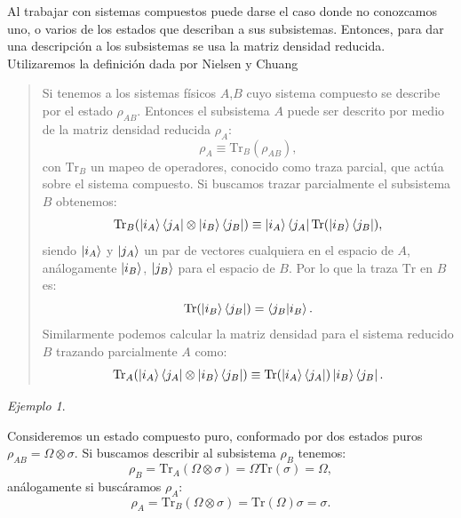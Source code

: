 \documentclass[letterpaper,12pt]{thesisECFM}
\theoremstyle{plain}
\theoremstyle{definition}
\theoremstyle{definition}
\theoremstyle{remark}
\newcommand{\1}{\mathbb{1}}
\newtheorem{ex}{Ejemplo}[section]
\begin{document}
Al trabajar con sistemas compuestos puede darse el caso donde no conozcamos
uno, o varios de los estados que describan a sus subsistemas. Entonces, para
dar una descripción a los subsistemas se usa la matriz densidad reducida.
Utilizaremos la definición dada por Nielsen y Chuang
\cite{nielsen_chuang_2011} 
\begin{quote}
    Si tenemos a los sistemas físicos $A$,$B$ cuyo sistema compuesto se describe
por el estado $\rho_{AB}$. Entonces el subsistema $A$ puede ser descrito por
medio de la matriz densidad reducida $\rho_A$:
\begin{equation}
    \rho_A \equiv \text{Tr}_B(\rho_{AB}),
\end{equation}
con $\text{Tr}_B$ un mapeo de operadores, conocido como traza parcial, que
actúa sobre el sistema compuesto. Si buscamos trazar parcialmente el subsistema
$B$ obtenemos:
\begin{equation}
    \text{Tr}_B(\ket{i_A}\bra{j_A} \otimes \ket{i_B}\bra{j_B}  ) \equiv \ket{i_A} \bra{j_A} \text{Tr}(\ket{i_B}\bra{j_B}),
\end{equation}
siendo $\ket{i_A}$ y $\ket{j_A}$ un par de vectores cualquiera en el espacio de
$A$, análogamente $\ket{i_B}$, $\ket{j_B}$ para el espacio de $B$. Por lo que
la traza $\text{Tr}$ en $B$ es:
\begin{equation*}
    \text{Tr}(\ket{i_B}\bra{j_B}) = \bra{j_B}\ket{i_B}.
\end{equation*}
Similarmente podemos calcular la matriz densidad para el sistema reducido $B$
trazando parcialmente $A$ como:
\begin{equation}
    \text{Tr}_A(\ket{i_A}\bra{j_A} \otimes \ket{i_B}\bra{j_B}  ) \equiv  \text{Tr}(\ket{i_A} \bra{j_A}) \ket{i_B}\bra{j_B}.
\end{equation}
\end{quote}
\begin{ex}\label{ex:traza parcial} \end{ex}  Consideremos un estado compuesto puro, conformado por dos estados puros $\rho_{AB} = \Omega  \otimes \sigma$. Si buscamos describir al subsistema $\rho_{B}$ tenemos:
\begin{equation}
    \rho_{B} = \text{Tr}_{A} (\Omega  \otimes \sigma) = \Omega \text{Tr}(\sigma) = \Omega, 
\end{equation}
análogamente si buscáramos $\rho_A$:
\begin{equation}
     \rho_{A} = \text{Tr}_{B} (\Omega  \otimes \sigma) = \text{Tr}(\Omega) \sigma = \sigma.
\end{equation}
\end{document}
